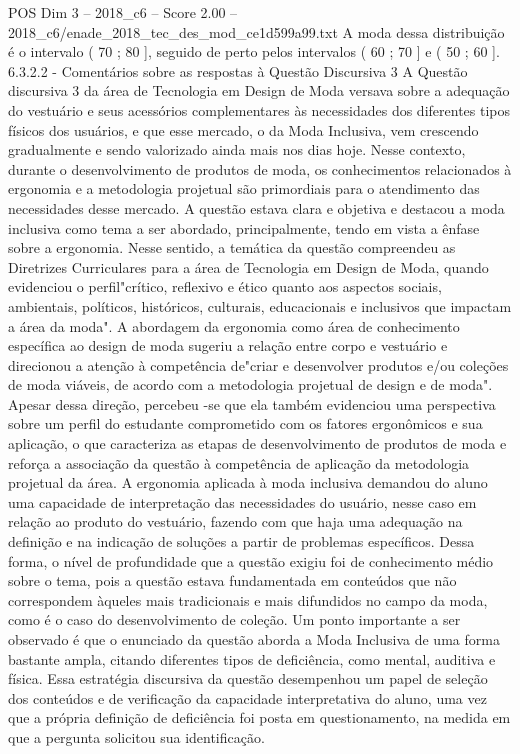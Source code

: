 \begin{textsample}{POS Dim 3 – 2018\_c6 – Score 2.00 – 2018\_c6/enade\_2018\_tec\_des\_mod\_ce1d599a99.txt}
A moda dessa distribuição é o intervalo ( 70 ; 80 ], seguido de perto pelos intervalos ( 60 ; 70 ] e ( 50 ; 60 ]. 6.3.2.2 - Comentários sobre as respostas à Questão Discursiva 3 A Questão discursiva 3 da área de Tecnologia em Design de Moda versava sobre a adequação do vestuário e seus acessórios complementares às necessidades dos diferentes tipos físicos dos usuários, e que esse mercado, o da Moda Inclusiva, vem crescendo gradualmente e sendo valorizado ainda mais nos dias hoje.
Nesse contexto, durante o desenvolvimento de produtos de moda, os conhecimentos relacionados à ergonomia e a metodologia projetual são primordiais para o atendimento das necessidades desse mercado.
A questão estava clara e objetiva e destacou a moda inclusiva como tema a ser abordado, principalmente, tendo em vista a ênfase sobre a ergonomia.
Nesse sentido, a temática da questão compreendeu as Diretrizes Curriculares para a área de Tecnologia em Design de Moda, quando evidenciou o perfil"crítico, reflexivo e ético quanto aos aspectos sociais, ambientais, políticos, históricos, culturais, educacionais e inclusivos que impactam a área da moda".
A abordagem da ergonomia como área de conhecimento específica ao design de moda sugeriu a relação entre corpo e vestuário e direcionou a atenção à competência de"criar e desenvolver produtos e/ou coleções de moda viáveis, de acordo com a metodologia projetual de design e de moda".
Apesar dessa direção, percebeu -se que ela também evidenciou uma perspectiva sobre um perfil do estudante comprometido com os fatores ergonômicos e sua aplicação, o que caracteriza as etapas de desenvolvimento de produtos de moda e reforça a associação da questão à competência de aplicação da metodologia projetual da área.
A ergonomia aplicada à moda inclusiva demandou do aluno uma capacidade de interpretação das necessidades do usuário, nesse caso em relação ao produto do vestuário, fazendo com que haja uma adequação na definição e na indicação de soluções a partir de problemas específicos.
Dessa forma, o nível de profundidade que a questão exigiu foi de conhecimento médio sobre o tema, pois a questão estava fundamentada em conteúdos que não correspondem àqueles mais tradicionais e mais difundidos no campo da moda, como é o caso do desenvolvimento de coleção.
Um ponto importante a ser observado é que o enunciado da questão aborda a Moda Inclusiva de uma forma bastante ampla, citando diferentes tipos de deficiência, como mental, auditiva e física.
Essa estratégia discursiva da questão desempenhou um papel de seleção dos conteúdos e de verificação da capacidade interpretativa do aluno, uma vez que a própria definição de deficiência foi posta em questionamento, na medida em que a pergunta solicitou sua identificação.

\end{textsample}
